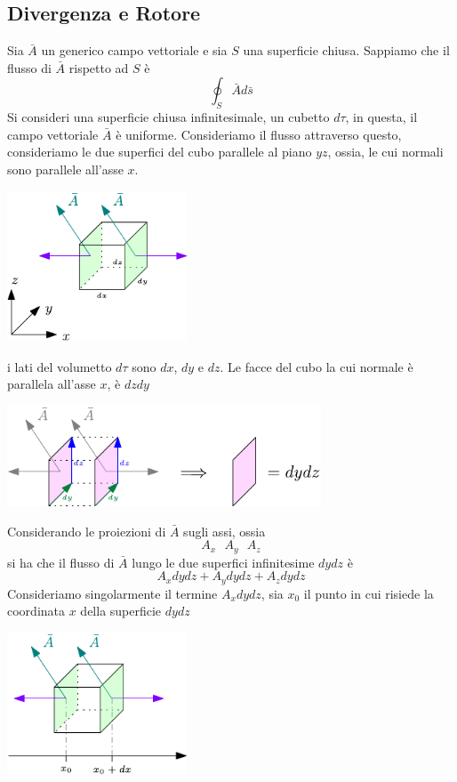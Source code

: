 \documentclass[10pt, letterpaper]{report}
\begin{document}
\subsection{Divergenza e Rotore}
Sia $\bar A$ un generico campo vettoriale e sia $S$ una superficie chiusa. Sappiamo che il flusso di $\bar A$ rispetto ad $S$ è
$$\oint_S \bar A d\bar s $$ 
Si consideri una superficie chiusa infinitesimale, un cubetto $d\tau$, in questa, il campo vettoriale $\bar A$ è uniforme. Consideriamo il flusso attraverso questo, consideriamo le due superfici del cubo parallele al piano $yz$, ossia, le cui normali sono parallele all'asse $x$.\begin{center}
    \includegraphics[width=0.4\textwidth]{images/Cubetto.pdf}
\end{center}
i lati del volumetto $d\tau$ sono $dx$, $dy$ e $dz$. Le facce del cubo la cui normale è parallela all'asse $x$, è $dzdy$\begin{center}
    \includegraphics[width=0.7\textwidth]{images/Cubetto2.pdf}
\end{center}
Considerando le proiezioni di $\bar A$ sugli assi, ossia $$ A_x \ \ \ A_y \ \ \ A_z$$
si ha che il flusso di $\bar A$ lungo le due superfici infinitesime $dydz$ è 
$$ A_xdydz+A_ydydz+A_zdydz$$
Consideriamo singolarmente il termine $A_xdydz$, sia $x_0$ il punto in cui risiede la coordinata $x$ della superficie $dydz$\begin{center}
    \includegraphics[width=0.4\textwidth]{images/Cubetto3.pdf}
\end{center}
\end{document}
